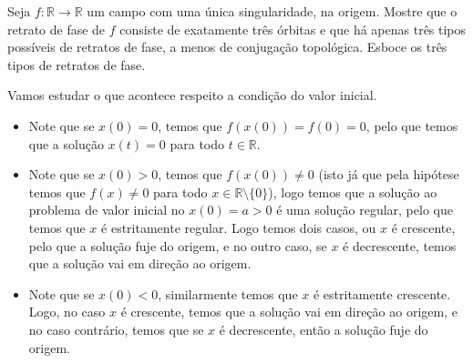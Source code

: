 \begin{homeworkProblem}[1-9]
  Seja $f : \mathbb{R} \to \mathbb{R}$ um campo com uma única singularidade, na origem. Mostre que o retrato de fase de $f$ consiste de exatamente três órbitas e que há apenas três tipos possíveis de retratos de fase, a menos de conjugação topológica. Esboce os três tipos de retratos de fase.
  \begin{solution}
    Vamos estudar o que acontece respeito a condição do  valor inicial.
    \begin{itemize}
      \item Note que se $x(0)=0$, temos que $f(x(0))=f(0)=0$, pelo que temos que a solução $x(t)=0$ para todo $t\in\mathbb{R}$.
      \item Note que se $x(0)>0$, temos que $f(x(0))\neq 0$ (isto já que pela hipótese temos que $f(x)\neq 0$ para todo $x\in\mathbb{R}\setminus\{0\}$), logo temos que a solução ao problema de valor inicial no $x(0)=a>0$ é uma solução regular, pelo que temos que $x$ é estritamente regular. Logo temos dois casos, ou $x$ é crescente, pelo que a solução fuje do origem, e no outro caso, se $x$ é decrescente, temos que a solução vai em direção ao origem.
      \item Note que se $x(0)<0$, similarmente temos que $x$ é estritamente crescente. Logo, no caso $x$ é crescente, temos que a solução vai em direção ao origem, e no caso contrário, temos que se $x$ é decrescente, então a solução fuje do origem. 
    \end{itemize}
  \end{solution}
\end{homeworkProblem}
